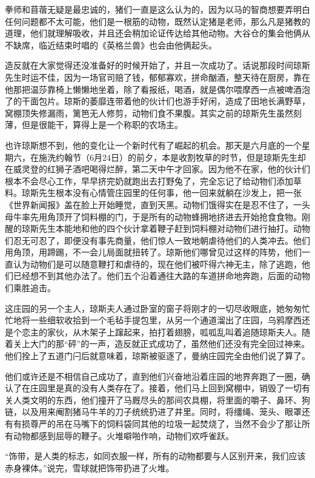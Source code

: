拳师和苜蓿无疑是最忠诚的，猪们一直是这么认为的，因为以马的智商想要弄明白任何问题都不太可能，他们是一根筋的动物，既然认定猪是老师，那么凡是猪教的道理，他们就理解吸收，并且还会稍加论证传达给其他动物。大谷仓的集会他俩从不缺席，临近结束时唱的《英格兰兽》也会由他俩起头。

造反就在大家觉得还没准备好的时候开始了，并且一次成功了。话说那段时间琼斯先生时运不佳，因为一场官司赔了钱，郁郁寡欢，拼命酗酒，整天待在厨房，靠在他那把温莎靠椅上懒懒地坐着，除了看报纸，喝酒，就是偶尔喂摩西一点被啤酒泡了的干面包片。琼斯的萎靡连带着他的伙计们也游手好闲，造成了田地长满野草，窝棚顶失修漏雨，篱笆无人修剪，动物们食不果腹。其实之前的琼斯先生虽然刻薄，但是很能干，算得上是一个称职的农场主。

也许琼斯想不到，他的变化让一个新时代有了崛起的机会。那天是六月底的一个星期六，在施洗约翰节（6月24日）的前夕，本是收割牧草的时节，但是琼斯先生却在威灵登的红狮子酒吧喝得烂醉，第二天中午才回家。因为他不在家，他的伙计们根本不会尽心工作，早早挤完奶就跑出去打野兔了，完全忘记了给动物们添加草料。琼斯先生根本没有心情管庄园里的任何事，他一回来就躺在沙发上，把一张《世界新闻报》盖在脸上开始睡觉，直到天黑。动物们饿得实在是忍不住了，一头母牛率先用角顶开了饲料棚的门，于是所有的动物蜂拥地挤进去开始抢食食物。刚醒的琼斯先生本能地和他的四个伙计拿着鞭子赶到饲料棚对动物们进行抽打。动物们忍无可忍了，即便没有事先商量，他们惊人一致地朝虐待他们的人类冲去。他们用角顶，用蹄踢，不一会儿局面就扭转了。琼斯他们哪曾见过这样的阵势，他们一直认为动物们是可以随意鞭打和虐待的，现在他们被吓得六神无主，除了逃跑，他们已经想不到其他办法了。他们五个沿着通往大路的车道拼命地奔跑，后面的动物们乘胜追击。

这庄园的另一个主人，琼斯夫人通过卧室的窗子将刚才的一切尽收眼底，她匆匆忙忙地将一些细软收拾到一个毛毡手提包里，从另一个通道溜出了庄园，乌鸦摩西还是个恋主的家伙，从木架子上蹿起来，拍打着翅膀，呱呱乱叫着追随琼斯夫人。随着关上大门的那“砰”的一声，造反就正式成功了，虽然他们还没有完全回过神来。他们拴上了五道门闩后就意味着，琼斯被驱逐了，曼纳庄园完全由他们说了算了。

他们或许还是不相信自己成功了，直到他们兴奋地沿着庄园的地界奔跑了一圈，确认了在庄园里是真的没有人类存在了。接着，他们马上回到窝棚中，销毁了一切有关人类文明的东西，他们撞开了马厩尽头的那间农具棚，将里面的嚼子、鼻环、狗链，以及用来阉割猪马牛羊的刀子统统扔进了井里。同时，将缰绳、笼头、眼罩还有有损尊严的吊在马嘴下的饲料袋同其他的垃圾一起焚烧了，当然不会少了那让所有动物都感到屈辱的鞭子。火堆噼啪作响，动物们欢呼雀跃。

“饰带，是人类的标志，如同衣服一样，所有的动物都要与人区别开来，我们应该赤身裸体。”说完，雪球就把饰带扔进了火堆。

